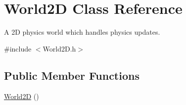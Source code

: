 \hypertarget{class_world2_d}{\section{World2\+D Class Reference}
\label{class_world2_d}
}


A 2\+D physics world which handles physics updates.  




{\ttfamily \#include $<$World2\+D.\+h$>$}

\subsection*{Public Member Functions}
\begin{DoxyCompactItemize}
\item 
\hypertarget{class_world2_d_a739e942c454a294f4eabb9ebe40c1971}{\hyperlink{class_world2_d_a739e942c454a294f4eabb9ebe40c1971}{World2\+D} ()}\label{class_world2_d_a739e942c454a294f4eabb9ebe40c1971}


\end{DoxyCompactItemize}
